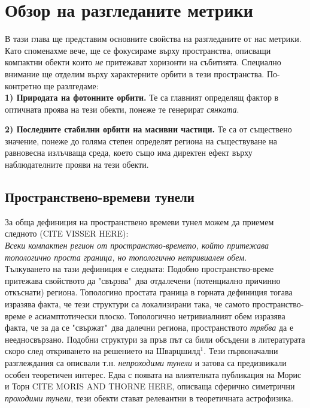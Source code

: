 \section{Обзор на разгледаните метрики}
В тази глава ще представим основните свойства на разгледаните от нас метрики. Като споменахме вече, ще се фокусираме върху пространства, описващи компактни обекти които \emph{не} притежават хоризонти на събитията. Специално внимание ще отделим върху характерните орбити в тези пространства. По-контретно ще разлгедаме:\\

\textbf{1) Природата на фотонните орбити.} Те са главният определящ фактор в оптичната проява на тези обекти, понеже те генерират \emph{сянката}.\newline

\textbf{2) Последните стабилни орбити на масивни частици.} Те са от съществено значение, понеже до голяма степен определят региона на съществуване на равновесна излъчваща среда, което също има директен ефект върху наблюдателните прояви на тези обекти.
 
\subsection{Пространствено-времеви тунели}
За обща дефиниция на пространствено времеви тунел можем да приемем следното (CIТE VISSER HERE):\\

\emph{Всеки компактен регион от пространство-времето, който притежава топологично проста граница, но топологично нетривиален обем.}\\\newline
Тълкуването на тази дефиниция е следната: Подобно пространство-време притежава свойството да "свързва"$\,$ два отдалечени (потенциално причинно откъснати) региона. Топологино простата граница в горната дефиниция тогава изразява факта, че тези структури са локализирани така, че самото пространство-време е асиамптотически плоско. Топологично нетривиалният обем изразява факта, че за да се "свържат"$\,$ два далечни региона, пространството \emph{трябва} да е неедносвързано. Подобни структури за пръв път са били обсъдени в литературата скоро след откриването на решението на Шварцшилд$^1$. Тези първоначални разглеждания са описвали т.н. \emph{непроходими тунели} и затова са предизвикали особен теоретичен интерес. Едва с появата на влиятелната публикация на Морис и Торн CITE MORIS AND THORNE HERE, описваща сферично симетрични \emph{проходими тунели}, тези обекти стават релевантни в теоретичната астрофизика.\\

